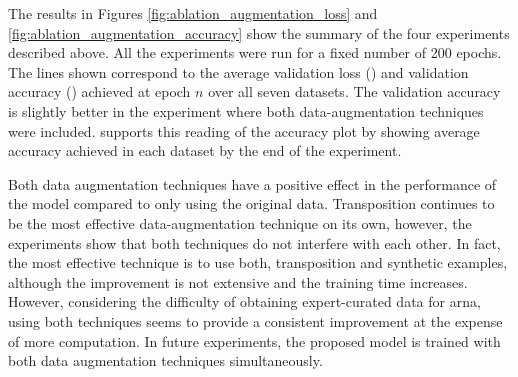 
The results in Figures \ref{fig:ablation_augmentation_loss}
and \ref{fig:ablation_augmentation_accuracy} show the
summary of the four experiments described above. All the
experiments were run for a fixed number of 200 epochs. The
lines shown correspond to the average validation loss
() and validation
accuracy () achieved
at epoch $n$ over all seven datasets. The validation
accuracy is slightly better in the experiment where both
data-augmentation techniques were included.
 supports this reading of the
accuracy plot by showing average accuracy achieved in each
dataset by the end of the experiment.




Both data augmentation techniques have a positive effect in
the performance of the model compared to only using the
original data. Transposition continues to be the most
effective data-augmentation technique on its own, however,
the experiments show that both techniques do not interfere
with each other. In fact, the most effective technique is to
use both, transposition and synthetic examples, although the
improvement is not extensive and the training time
increases. However, considering the difficulty of obtaining
expert-curated data for \gls{arna}, using both techniques
seems to provide a consistent improvement at the expense of
more computation. In future experiments, the proposed model
is trained with both data augmentation techniques
simultaneously.
